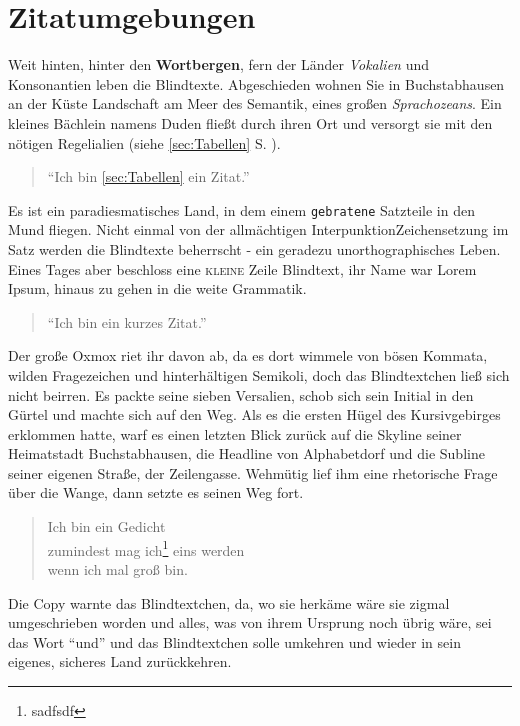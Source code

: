 \documentclass[%
	12pt,%
	a4paper,%
	oneside,%
	liststotoc, idxtotoc, bibtotoc, %
	parskip=half,%
	nochapterprefix,%
	appendixprefix, %
	headings=small,%
]{scrreprt}
\begin{document}
%
\chapter{Zitatumgebungen}
\label{sec:Zitate}

Weit hinten, hinter den \textbf{Wortbergen}, fern der Länder \textit{Vokalien} und Konsonantien leben die Blindtexte. Abgeschieden wohnen Sie in Buchstabhausen an der Küste {Landschaft am Meer}
des Semantik, eines großen \textsl{Sprachozeans}. Ein kleines Bächlein namens Duden fließt durch ihren Ort und versorgt sie mit den nötigen Regelialien (siehe \ref{sec:Tabellen} S. \pageref{sec:Tabellen}).

\begin{quotation}
	"`Ich bin \ref{sec:Tabellen} ein Zitat."'
\end{quotation}

Es ist ein paradiesmatisches Land, in dem einem \texttt{gebratene} Satzteile in den Mund fliegen. Nicht einmal von der allmächtigen Interpunktion{Zeichensetzung im Satz} werden die Blindtexte beherrscht - ein geradezu unorthographisches Leben. Eines Tages aber beschloss eine \textsc{kleine} Zeile Blindtext, ihr Name war Lorem Ipsum, hinaus zu gehen in die weite Grammatik. \begin{quote}"`Ich bin ein kurzes Zitat."'\end{quote} Der große Oxmox riet ihr davon ab, da es dort wimmele von bösen Kommata, wilden Fragezeichen und hinterhältigen Semikoli, doch das Blindtextchen ließ sich nicht beirren. Es packte seine sieben Versalien, schob sich sein Initial in den Gürtel und machte sich auf den Weg. Als es die ersten Hügel des Kursivgebirges erklommen hatte, warf es einen letzten Blick zurück auf die Skyline seiner Heimatstadt Buchstabhausen, die Headline von Alphabetdorf und die Subline seiner eigenen Straße, der Zeilengasse. Wehmütig lief ihm eine rhetorische Frage über die Wange, dann setzte es seinen Weg fort.

\begin{verse}
	Ich bin ein Gedicht\\
	zumindest mag ich\footnote{sadfsdf} eins werden\\
	wenn ich mal groß bin.
\end{verse}

Die Copy warnte das Blindtextchen, da, wo sie herkäme wäre sie zigmal umgeschrieben worden und alles, was von ihrem Ursprung noch übrig wäre, sei das Wort "`und"'  und das Blindtextchen solle umkehren und wieder in sein eigenes, sicheres Land zurückkehren.
\end{document}
